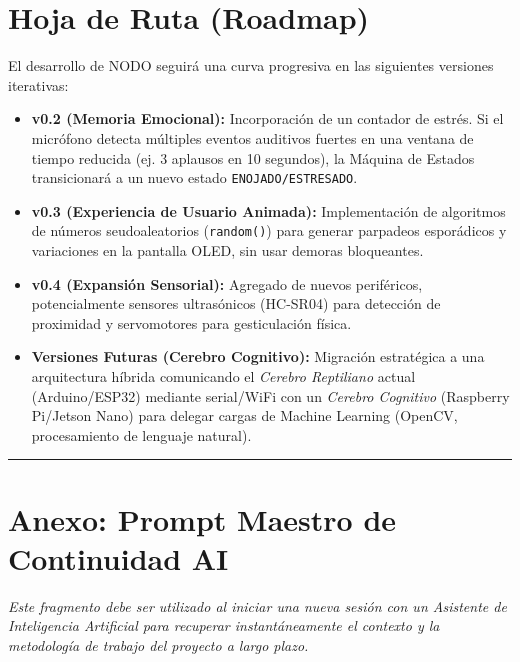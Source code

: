 \documentclass[10pt]{article}
\begin{document}
\newpage
\section{Hoja de Ruta (Roadmap)}
El desarrollo de NODO seguirá una curva progresiva en las siguientes versiones iterativas:
\begin{itemize}
    \item \textbf{v0.2 (Memoria Emocional):} Incorporación de un contador de estrés. Si el micrófono detecta múltiples eventos auditivos fuertes en una ventana de tiempo reducida (ej. 3 aplausos en 10 segundos), la Máquina de Estados transicionará a un nuevo estado \texttt{ENOJADO/ESTRESADO}.
    \item \textbf{v0.3 (Experiencia de Usuario Animada):} Implementación de algoritmos de números seudoaleatorios (\texttt{random()}) para generar parpadeos esporádicos y variaciones en la pantalla OLED, sin usar demoras bloqueantes.
    \item \textbf{v0.4 (Expansión Sensorial):} Agregado de nuevos periféricos, potencialmente sensores ultrasónicos (HC-SR04) para detección de proximidad y servomotores para gesticulación física.
    \item \textbf{Versiones Futuras (Cerebro Cognitivo):} Migración estratégica a una arquitectura híbrida comunicando el \textit{Cerebro Reptiliano} actual (Arduino/ESP32) mediante serial/WiFi con un \textit{Cerebro Cognitivo} (Raspberry Pi/Jetson Nano) para delegar cargas de Machine Learning (OpenCV, procesamiento de lenguaje natural).
\end{itemize}

\vspace{1cm}
\hrule
\vspace{0.5cm}

\section{Anexo: Prompt Maestro de Continuidad AI}
\textit{Este fragmento debe ser utilizado al iniciar una nueva sesión con un Asistente de Inteligencia Artificial para recuperar instantáneamente el contexto y la metodología de trabajo del proyecto a largo plazo.}
\end{document}
